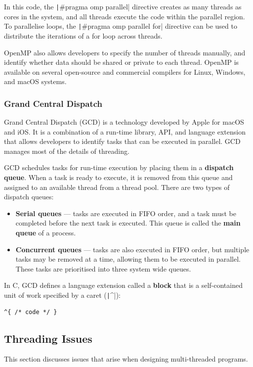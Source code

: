 \documentclass{article}
\begin{document}
\inputminted{c}{code/openmp.c}

In this code, the \texttt|#pragma omp parallel| directive
creates as many threads as cores in the system, and all threads execute
the code within the parallel region. To parallelise loops, the
\texttt|#pragma omp parallel for| directive can be used to
distribute the iterations of a for loop across threads.

OpenMP also allows developers to specify the number of threads
manually, and identify whether data should be shared or private to each
thread. OpenMP is available on several open-source and commercial
compilers for Linux, Windows, and macOS systems.
\subsubsection{Grand Central Dispatch}
Grand Central Dispatch (GCD) is a technology developed by Apple for
macOS and iOS. It is a combination of a run-time library, API, and
language extension that allows developers to identify tasks that can be
executed in parallel. GCD manages most of the details of threading.

GCD schedules tasks for run-time execution by placing them in a
\textbf{dispatch queue}. When a task is ready to execute, it is removed
from this queue and assigned to an available thread from a thread pool.
There are two types of dispatch queues:
\begin{itemize}
    \item \textbf{Serial queues} --- tasks are executed in FIFO order,
          and a task must be completed before the next task is executed.
          This queue is called the \textbf{main queue} of a process.
    \item \textbf{Concurrent queues} --- tasks are also executed in
          FIFO order, but multiple tasks may be removed at a time,
          allowing them to be executed in parallel.
          These tasks are prioritised into three system wide queues.
\end{itemize}
In C, GCD defines a language extension called a \textbf{block} that is a
self-contained unit of work specified by a caret (\texttt|^|):
\begin{verbatim}
^{ /* code */ }
\end{verbatim}
\subsection{Threading Issues}
This section discusses issues that arise when designing multi-threaded
programs.
\end{document}
